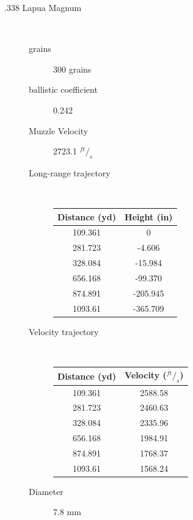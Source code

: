 \documentclass{article}%
\begin{document}
\begin{description}
        \item[.338 Lapua Magnum]\mbox{ }
            \begin{description}
                \item[grains] 300 grains
                \item[ballistic coefficient] 0.242
                \item[Muzzle Velocity] 2723.1 $^{ft}/_s$
                \item[Long-range trajectory]\mbox{ } 
                \begin{table}[h!]
                \center
                    \begin{tabular}{c|c}
                        Distance (yd) & Height (in) \\ \hline
                        109.361 & 0 \\
                        281.723 & -4.606 \\
                        328.084 & -15.984 \\
                        656.168 & -99.370 \\
                        874.891 & -205.945\\
                        1093.61 & -365.709 \\
                    \end{tabular}
                \end{table}
                \item[Velocity trajectory]\mbox { }
                \begin{table}[h!]
                \center
                    \begin{tabular}{c|c}
                        Distance (yd) & Velocity ($^{ft}/_s$) \\ \hline
                        109.361 & 2588.58 \\
                        281.723 & 2460.63 \\
                        328.084 & 2335.96 \\
                        656.168 & 1984.91 \\
                        874.891 & 1768.37 \\
                        1093.61 & 1568.24 \\
                    \end{tabular}
                \end{table}
                \item[Diameter] 7.8 mm
            \end{description}
    \end{description}
    
\end{document}
